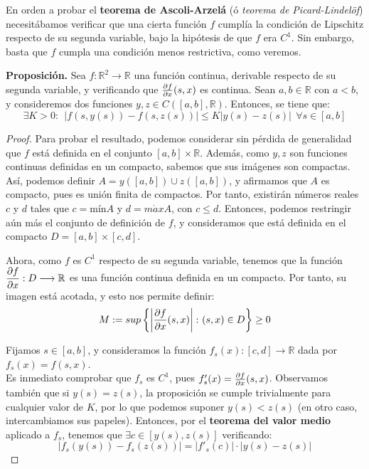 \begin{ejer} \hfill

En orden a probar el \textbf{teorema de Ascoli-Arzelá} (ó \textit{teorema de Picard-Lindelöf}) necesitábamos verificar que una cierta función $f$ cumplía la condición de Lipschitz respecto de su segunda variable, bajo la hipótesis de que $f$ era $C^1$. Sin embargo, basta que $f$ cumpla una condición menos restrictiva, como veremos.

\textbf{Proposición.} Sea $f:\mathbb{R}^2 \longrightarrow \mathbb{R}$ una función continua, derivable respecto de su segunda variable, y verificando que $\pder[f]{x}(s,x)$ es continua. Sean $a,b \in \mathbb{R}$ con $a < b$, y consideremos dos funciones $y,z \in C([a,b],\mathbb{R})$. Entonces, se tiene que: $$\exists K > 0 : \ \ |f(s,y(s)) - f(s,z(s)) | \le K|y(s)-z(s)| \ \ \forall s \in [a,b]$$

\begin{proof} \hfill

Para probar el resultado, podemos considerar sin pérdida de generalidad que $f$ está definida en el conjunto $[a,b] \times \mathbb{R}$. Además, como $y,z$ son funciones continuas definidas en un compacto, sabemos que sus imágenes son compactas. Así, podemos definir $A = y([a,b]) \cup z([a,b])$, y afirmamos que $A$ es compacto, pues es unión finita de compactos. Por tanto, existirán números reales $c$ y $d$ tales que $c = \text{mín} A$ y $d = m\acute{a}x A$, con $c \le d$. Entonces, podemos restringir aún más el conjunto de definición de $f$, y consideramos que está definida en el compacto $D = [a,b]\times [c,d]$.

Ahora, como $f$ es $C^1$ respecto de su segunda variable, tenemos que la función $\displaystyle\pder[f]{x}: D \longrightarrow \mathbb{R}$ es una función continua definida en un compacto. Por tanto, su imagen está acotada, y esto nos permite definir: $$M := sup \left\{ \left| \pder[f]{x}(s,x) \right|\colon (s,x) \in D\right\} \ge 0$$

Fijamos $s \in [a,b]$, y consideramos la función $f_s(x):[c,d] \longrightarrow \mathbb{R}$ dada por $f_s(x) = f(s,x)$.\\ Es inmediato comprobar que $f_s$ es $C^1$, pues $f_s'(x) = \pder[f]{x}(s,x)$. Observamos también que si $y(s)=z(s)$, la proposición se cumple trivialmente para cualquier valor de $K$, por lo que podemos suponer $y(s) < z(s)$ (en otro caso, intercambiamos sus papeles). Entonces, por el \textbf{teorema del valor medio} aplicado a $f_s$, tenemos que $\exists c \in [y(s), z(s)]$ verificando: $$|f_s(y(s)) - f_s(z(s))| = |f'_s(c)|\cdot|y(s)-z(s)|$$


\end{proof}
\end{ejer}
